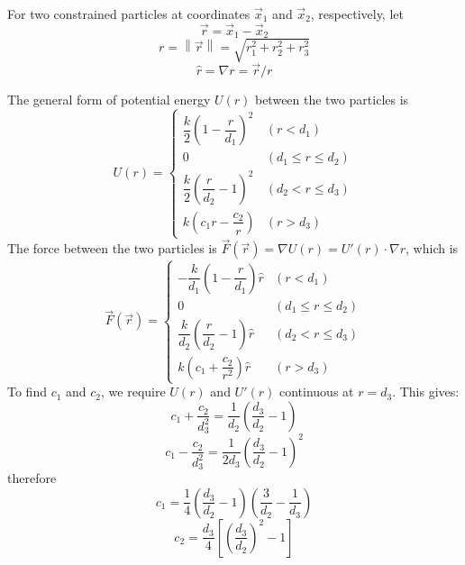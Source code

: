 \documentclass[10pt]{article}
\newcommand{\norm}[1]{\left\lVert#1\right\rVert}
\begin{document}
For two constrained particles at coordinates $\vec{x}_1$ and $\vec{x}_2$,
respectively, let
$$\vec{r}=\vec{x}_1-\vec{x}_2$$
$$r=\norm{\vec{r}}=\sqrt{r_1^2+r_2^2+r_3^2}$$
$$\hat{r}=\nabla r=\vec{r}/r$$

The general form of potential energy $U(r)$ between the two particles is
\begin{equation*}
U(r)=\left\{\begin{array}{ll}
\dfrac{k}{2}\left(1-\dfrac{r}{d_1}\right)^2 & (r < d_1) \\
0 & (d_1\le r\le d_2) \\
\dfrac{k}{2}\left(\dfrac{r}{d_2}-1\right)^2 & (d_2 < r \le d_3) \\
k\left(c_1 r - \dfrac{c_2}{r}\right) & (r > d_3)
\end{array}\right.
\end{equation*}
The force between the two particles is $\vec{F}(\vec{r})=\nabla
U(r)=U'(r)\cdot\nabla r$, which is
\[
\vec{F}(\vec{r})=\left\{\begin{array}{ll}
-\dfrac{k}{d_1}\left(1-\dfrac{r}{d_1}\right)\hat{r} & (r < d_1) \\
0 & (d_1\le r\le d_2) \\
\dfrac{k}{d_2}\left(\dfrac{r}{d_2}-1\right)\hat{r} & (d_2 < r \le d_3) \\
k\left(c_1+\dfrac{c_2}{r^2}\right)\hat{r} & (r > d_3)
\end{array}\right.
\]
To find $c_1$ and $c_2$, we require $U(r)$ and $U'(r)$ continuous at
$r=d_3$. This gives:
\[
c_1 + \frac{c_2}{d_3^2} = \frac{1}{d_2}\left(\frac{d_3}{d_2}-1\right)
\]
\[
c_1 - \frac{c_2}{d_3^2} = \frac{1}{2d_3}\left(\frac{d_3}{d_2}-1\right)^2
\]
therefore
\[
c_1=\frac{1}{4}\left(\frac{d_3}{d_2}-1\right)\left(\frac{3}{d_2}-\frac{1}{d_3}\right)
\]
\[
c_2=\frac{d_3}{4}\left[\left(\frac{d_3}{d_2}\right)^2-1\right]
\]
\end{document}
